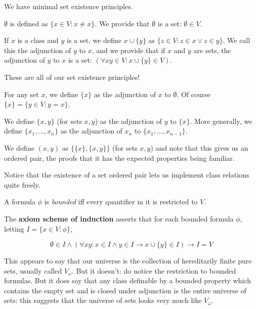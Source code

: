 \documentclass{slides}
\begin{document}
\begin{slide}

We have minimal set existence principles.

$\emptyset$ is defined as $\{x \in V:x \neq x\}$.  We provide that $\emptyset$ is a set: $\emptyset \in V$.

If $x$ is a class and $y$ is a set, we define $x \cup \{y\}$ as $\{z \in V:z \in x \vee z \in y\}$.  We call this the adjunction of $y$ to $x$, and we provide that if $x$ and $y$ are sets, the adjunction of $y$ to $x$ is a set: $(\forall xy \in V:x \cup \{y\} \in V)$.

These are all of our set existence principles!


\end{slide}

\begin{slide}

For any set $x$, we define $\{x\}$ as the adjunction of $x$ to $\emptyset$.  Of course $\{x\} = \{y \in V:y=x\}$.

We define $\{x,y\}$ (for sets $x,y$) as the adjunction of $y$ to $\{x\}$.  More generally, we define $\{x_1,\ldots,x_n\}$
as the adjunction of $x_n$ to $\{x_1,\ldots,x_{n-1}\}$.

We define $(x,y)$ as $\{\{x\},\{x,y\}\}$ (for sets $x,y$) and note that this gives us an ordered pair, the proofs that it has the expected properties being familiar.

Notice that the existence of a set ordered pair lets us implement class relations quite freely.

\end{slide}

\begin{slide}

A formula $\phi$ is {\em bounded\/} iff every quantifier in it is restricted to $V$.

The {\bf axiom scheme of induction\/} asserts that for each bounded formula $\phi$, \newline letting $I = \{x \in V:\phi\}$,

$$\emptyset \in I \wedge (\forall xy:x \in I \wedge y \in I \rightarrow x \cup \{y\} \in I) \rightarrow I = V$$

This appears to say that our universe is the collection of hereditarily finite pure sets, usually called $V_\omega$.  But it doesn't:  do notice the restriction to bounded formulas.  But it does say that any class definable by a bounded property which contains the empty set and is closed under adjunction is the entire universe of sets:  this suggests that the universe of sets looks very much like $V_\omega$.

\end{slide}
\end{document}
